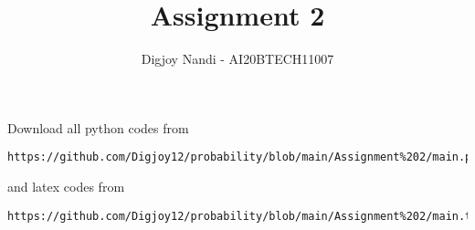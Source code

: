 \documentclass[journal,12pt,twocolumn]{IEEEtran}
\DeclareMathOperator*{\Res}{Res}
\begin{document}
\newcommand{\BEQA}{\begin{eqnarray}}
\newcommand{\EEQA}{\end{eqnarray}}
\newcommand{\define}{\stackrel{\triangle}{=}}

\raggedbottom
\setlength{\parindent}{0pt}
\providecommand{\mbf}{\mathbf}
\providecommand{\pr}[1]{\ensuremath{\Pr\left(#1\right)}}
\providecommand{\qfunc}[1]{\ensuremath{Q\left(#1\right)}}
\providecommand{\sbrak}[1]{\ensuremath{{}\left[#1\right]}}
\providecommand{\lsbrak}[1]{\ensuremath{{}\left[#1\right.}}
\providecommand{\rsbrak}[1]{\ensuremath{{}\left.#1\right]}}
\providecommand{\brak}[1]{\ensuremath{\left(#1\right)}}
\providecommand{\lbrak}[1]{\ensuremath{\left(#1\right.}}
\providecommand{\rbrak}[1]{\ensuremath{\left.#1\right)}}
\providecommand{\cbrak}[1]{\ensuremath{\left\{#1\right\}}}
\providecommand{\lcbrak}[1]{\ensuremath{\left\{#1\right.}}
\providecommand{\rcbrak}[1]{\ensuremath{\left.#1\right\}}}
\theoremstyle{remark}
\newtheorem{rem}{Remark}
\newcommand{\sgn}{\mathop{\mathrm{sgn}}}
\providecommand{\abs}[1]{\vert#1\vert}
\providecommand{\res}[1]{\Res\displaylimits_{#1}} 
\providecommand{\norm}[1]{\lVert#1\rVert}
\providecommand{\mtx}[1]{\mathbf{#1}}
\providecommand{\mean}[1]{E[ #1 ]}
\providecommand{\fourier}{\overset{\mathcal{F}}{ \rightleftharpoons}}
\providecommand{\system}{\overset{\mathcal{H}}{ \longleftrightarrow}}
\newcommand{\solution}{\noindent \textbf{Solution: }}
\newcommand{\cosec}{\,\text{cosec}\,}
\providecommand{\dec}[2]{\ensuremath{\overset{#1}{\underset{#2}{\gtrless}}}}
\newcommand{\myvec}[1]{\ensuremath{\begin{pmatrix}#1\end{pmatrix}}}
\newcommand{\mydet}[1]{\ensuremath{\begin{vmatrix}#1\end{vmatrix}}}
\makeatletter
{}
\makeatother
\let\StandardTheFigure\thefigure
\let\vec\mathbf
\renewcommand{\thefigure}{\theproblem}
\def\putbox#1#2#3{\makebox[0in][l]{\makebox[#1][l]{}\raisebox{\baselineskip}[0in][0in]{\raisebox{#2}[0in][0in]{#3}}}}
     \def\rightbox#1{\makebox[0in][r]{#1}}
     \def\centbox#1{\makebox[0in]{#1}}
     \def\topbox#1{\raisebox{-\baselineskip}[0in][0in]{#1}}
     \def\midbox#1{\raisebox{-0.5\baselineskip}[0in][0in]{#1}}
\vspace{3cm}
\title{Assignment 2}
\author{Digjoy Nandi - AI20BTECH11007}
\maketitle
\newpage
\bigskip
\renewcommand{\thefigure}{\theenumi}
\renewcommand{\thetable}{\theenumi}
Download all python codes from 
\begin{lstlisting}
https://github.com/Digjoy12/probability/blob/main/Assignment%202/main.py
\end{lstlisting}
%
and latex codes from 
%
\begin{lstlisting}
https://github.com/Digjoy12/probability/blob/main/Assignment%202/main.tex
\end{lstlisting}
\end{document}
